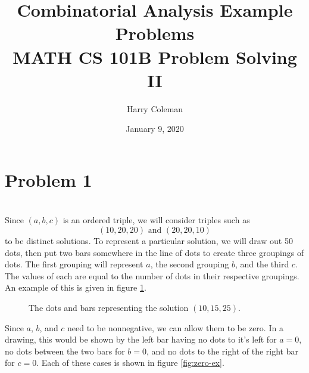 \documentclass[12pt]{article}
\begin{document}
 
\title{Combinatorial Analysis Example Problems\\
    \large MATH CS 101B Problem Solving II}
\author{Harry Coleman}
\date{January 9, 2020}

\maketitle

\section*{Problem 1}
\\

Since $(a,b,c)$ is an ordered triple, we will consider triples such as
\[(10,20,20) \text{ and } (20,20,10)\]
to be distinct solutions. To represent a particular solution, we will draw out 50 dots, then put two bars somewhere in the line of dots to create three groupings of dots. The first grouping will represent $a$, the second grouping $b$, and the third $c$. The values of each are equal to the number of dots in their respective groupings. An example of this is given in figure \ref{fig:dots-ex}.

\begin{figure}[ht]
    \centering
    \caption{The dots and bars representing the solution $(10,15,25)$.}
    \label{fig:dots-ex}
\end{figure}

Since $a$, $b$, and $c$ need to be nonnegative, we can allow them to be zero. In a drawing, this would be shown by the left bar having no dots to it's left for $a=0$, no dots between the two bars for $b=0$, and no dots to the right of the right bar for $c=0$. Each of these cases is shown in figure \ref{fig:zero-ex}.
\end{document}
